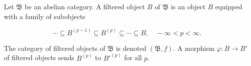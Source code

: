Let $\mathfrak{B}$ be an abelian category. A filtered object $B$ of $\mathfrak{B}$ is an object $B$ equipped with a family of subobjects

$$\cdots \subseteq B^{(p-1)} \subseteq B^{(p)} \subseteq \cdots \subseteq B, \quad -\infty < p < \infty.$$

The category of filtered objects of $\mathfrak{B}$ is denoted $(\mathfrak{B}, f)$. A morphism $\varphi : B \rightarrow B'$ of filtered objects sends $B^{(p)}$ to $B'^{(p)}$ for all $p$.

